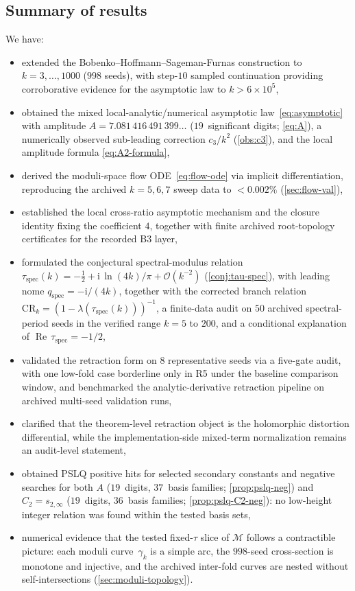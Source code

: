 \documentclass[11pt,a4paper]{article}
\theoremstyle{plain}
\theoremstyle{definition}
\theoremstyle{remark}
\DeclareMathOperator{\Real}{Re}
\newcommand{\ii}{\mathrm{i}}
\newcommand{\Oo}{\mathcal{O}}
\begin{document}
\subsection{Summary of results}
We have:
\begin{itemize}[nosep]
\item extended the Bobenko--Hoffmann--Sageman-Furnas construction to
  $k = 3,\ldots,1000$ ($998$ seeds), with step-$10$ sampled
  continuation providing corroborative evidence for the asymptotic law
  to $k > 6\times 10^5$,
\item obtained the mixed local-analytic/numerical asymptotic
  law~\eqref{eq:asymptotic} with amplitude
  $A = 7.081\,416\,491\,399\ldots$ ($19$~significant digits;
  \eqref{eq:A}), a numerically observed sub-leading correction
  $c_3/k^2$ (\cref{obs:c3}), and the local amplitude formula
  \eqref{eq:A2-formula},
\item derived the moduli-space flow ODE~\eqref{eq:flow-ode} via
  implicit differentiation, reproducing the archived $k=5,6,7$ sweep data to
  $< 0.002\%$ (\cref{sec:flow-val}),
\item established the local cross-ratio asymptotic mechanism and the
  closure identity fixing the coefficient $4$, together with finite
  archived root-topology certificates for the recorded B3 layer,
\item formulated the conjectural spectral-modulus relation
  $\tau_{\mathrm{spec}}(k) = -\tfrac12 + \ii\,\ln(4k)/\pi + \Oo(k^{-2})$
  (\cref{conj:tau-spec}), with leading nome
  $q_{\mathrm{spec}} = -\ii/(4k)$, together with the corrected branch
  relation $\mathrm{CR}_k=(1-\lambda(\tau_{\mathrm{spec}}(k)))^{-1}$,
  a finite-data audit on $50$ archived spectral-period seeds in the
  verified range $k=5$ to $200$, and a conditional explanation of
  $\Real\,\tau_{\mathrm{spec}}=-1/2$,
\item validated the retraction form on $8$ representative seeds via a
  five-gate audit, with one low-fold case borderline only in R5 under the
  baseline comparison window, and benchmarked the analytic-derivative retraction pipeline
  on archived multi-seed validation runs,
\item clarified that the theorem-level retraction object is the
  holomorphic distortion differential, while the implementation-side
  mixed-term normalization remains an audit-level statement,
\item obtained PSLQ positive hits for selected secondary constants and
  negative searches for
  both $A$ ($19$~digits, $37$~basis families; \cref{prop:pslq-neg}) and
  $C_2 = s_{2,\infty}$ ($19$~digits, $36$~basis families;
  \cref{prop:pslq-C2-neg}): no low-height integer relation
  was found within the tested basis sets,
\item numerical evidence that the tested fixed-$\tau$ slice of
  $\mathcal{M}$ follows a contractible picture:
  each moduli curve~$\gamma_k$ is a simple arc, the $998$-seed
  cross-section is monotone and injective, and the archived inter-fold
  curves are nested without self-intersections
  (\cref{sec:moduli-topology}).
\end{itemize}
\end{document}
